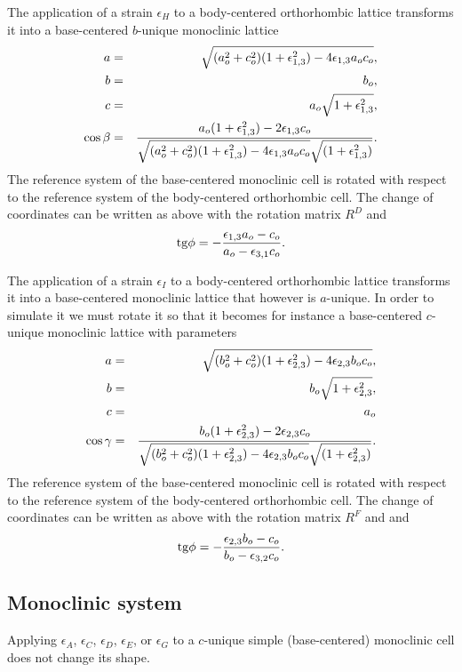 \documentclass[12pt,a4paper]{article}
\begin{document}
The application of a strain $\epsilon_H$ to a body-centered orthorhombic
lattice transforms it into a base-centered $b$-unique monoclinic lattice 
\begin{eqnarray}
a&=&\sqrt{(a_o^2+c_o^2)(1+\epsilon_{1,3}^2)-4\epsilon_{1,3}a_oc_o}, \\
b&=&b_o, \\
c&=&a_o \sqrt{1+\epsilon_{1,3}^2}, \\
\cos\beta &=& {a_o (1+\epsilon_{1,3}^2) -2 \epsilon_{1,3} c_o \over 
\sqrt{(a_o^2+c_o^2)(1+\epsilon_{1,3}^2)-4\epsilon_{1,3}a_oc_o} 
\sqrt{(1+\epsilon_{1,3}^2)}}.
\end{eqnarray}
The reference system of the base-centered monoclinic cell is rotated 
with respect to the reference system of the body-centered orthorhombic cell. 
The change of coordinates can be written as above with the rotation matrix 
$R^D$ and
\begin{equation}
{\rm tg} \phi = -{\epsilon_{1,3} a_o - c_o \over a_o - \epsilon_{3,1} c_o}.
\end{equation}

The application of a strain $\epsilon_I$ to a body-centered orthorhombic
lattice transforms it into a base-centered monoclinic lattice that however
is $a$-unique. In order to simulate it we must rotate it so that it
becomes for instance a base-centered $c$-unique monoclinic lattice with
parameters
\begin{eqnarray}
a&=&\sqrt{(b_o^2+c_o^2)(1+\epsilon_{2,3}^2)-4\epsilon_{2,3}b_oc_o}, \\
b&=&b_o \sqrt{1+\epsilon_{2,3}^2}, \\
c&=&a_o \\
\cos\gamma &=& {b_o (1+\epsilon_{2,3}^2) -2 \epsilon_{2,3} c_o \over 
\sqrt{(b_o^2+c_o^2)(1+\epsilon_{2,3}^2)-4\epsilon_{2,3}b_oc_o} 
\sqrt{(1+\epsilon_{2,3}^2)}}.
\end{eqnarray}
The reference system of the base-centered monoclinic cell is rotated 
with respect to the reference system of the body-centered orthorhombic cell. 
The change of coordinates can be written as above with the rotation matrix 
$R^F$ and
and 
\begin{equation}
{\rm tg} \phi = -{\epsilon_{2,3} b_o - c_o \over b_o - \epsilon_{3,2} c_o}.
\end{equation}

\subsection{\color{web-blue} Monoclinic system}
Applying $\epsilon_A$, $\epsilon_C$, $\epsilon_D$, $\epsilon_E$, or
$\epsilon_G$ to a $c$-unique simple (base-centered) monoclinic cell does 
not change its shape.
\end{document}
